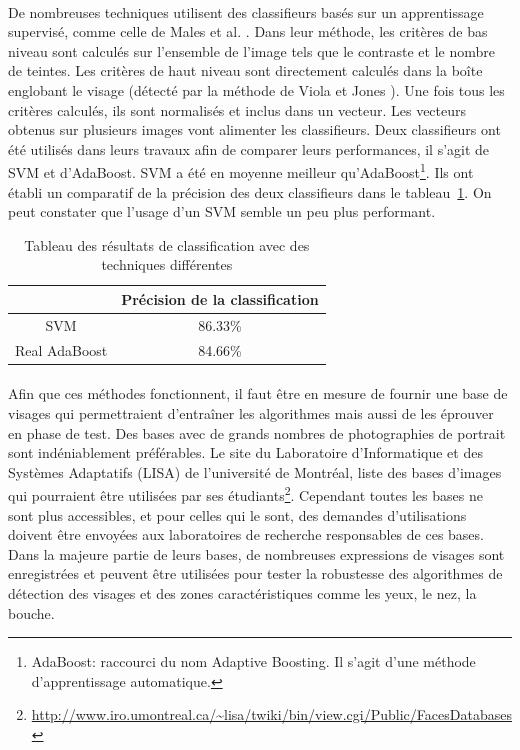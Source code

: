 \documentclass[11pt, french]{report-rd-info}
\begin{document}
\paragraph*{}
De nombreuses techniques utilisent des classifieurs basés sur un apprentissage supervisé, comme celle de Males et al. \cite{Males2013}. Dans leur méthode, les critères de bas niveau sont calculés sur l’ensemble de l’image tels que le contraste et le nombre de teintes. Les critères de haut niveau sont directement calculés dans la boîte englobant le visage (détecté par la méthode de Viola et Jones \cite{Viola2004}). Une fois tous les critères calculés, ils sont normalisés et inclus dans un vecteur. Les vecteurs obtenus sur plusieurs images vont alimenter les classifieurs. Deux classifieurs ont été utilisés dans leurs travaux afin de comparer leurs performances, il s’agit de SVM et d’AdaBoost. SVM a été en moyenne meilleur qu’AdaBoost\footnote{AdaBoost: raccourci du nom Adaptive Boosting. Il s'agit d'une méthode d'apprentissage automatique.}. Ils ont établi un comparatif de la précision des deux classifieurs dans le tableau~\ref{tab:ComparaisonSVMAdaBoost}. On peut constater que l'usage d'un SVM semble un peu plus performant.
\begin{table}
\begin{center}
\begin{tabular}{|c|c|}
\hline
& Précision de la classification \\
\hline
SVM & 86.33\% \\
\hline
Real AdaBoost & 84.66\% \\
\hline
\end{tabular}
\end{center}
\caption{Tableau des résultats de classification avec des techniques différentes \cite{Males2013}}
\label{tab:ComparaisonSVMAdaBoost}
\end{table}
\paragraph*{}
Afin que ces méthodes fonctionnent, il faut être en mesure de fournir une base de visages qui permettraient d'entraîner les algorithmes mais aussi de les éprouver en phase de test.
Des bases avec de grands nombres de photographies de portrait sont indéniablement préférables. Le site du Laboratoire d'Informatique et des Systèmes Adaptatifs (LISA) de l'université de Montréal, liste des bases d'images qui pourraient être utilisées par ses étudiants\footnote{\url{http://www.iro.umontreal.ca/~lisa/twiki/bin/view.cgi/Public/FacesDatabases}}. Cependant toutes les bases ne sont plus accessibles, et pour celles qui le sont, des demandes d'utilisations doivent être envoyées aux laboratoires de recherche responsables de ces bases. Dans la majeure partie de leurs bases, de nombreuses expressions de visages sont enregistrées et peuvent être utilisées pour tester la robustesse des algorithmes de détection des visages et des zones caractéristiques comme les yeux, le nez, la bouche.
\end{document}
